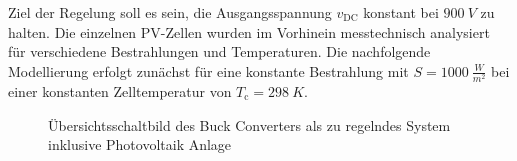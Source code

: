 Ziel der Regelung soll es sein, die Ausgangsspannung $v_{\mathrm{DC}}$ konstant bei $\SI{900}{V}$ zu halten. Die einzelnen PV-Zellen wurden im Vorhinein messtechnisch analysiert für verschiedene Bestrahlungen und Temperaturen. Die nachfolgende Modellierung erfolgt zunächst für eine konstante Bestrahlung mit $S = \SI{1000}{\frac{W}{m^2}}$ bei einer konstanten Zelltemperatur von $T_{\mathrm{c}} = \SI{298}{K}$.

\begin{figure}[H]
   \centering
   \caption[Skizze der Regelaufgabe]{Übersichtsschaltbild des Buck Converters als zu regelndes System inklusive Photovoltaik Anlage}
   \label{fig:Bild1}
\end{figure}
